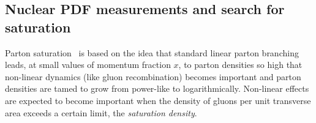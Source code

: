 \documentclass[../report.tex]{subfiles}
\begin{document}
  
\subsection{Nuclear PDF measurements and search for saturation}
\label{sec:HE_smallx}

\newcommand{\pizero}{\ensuremath{\pi^{0}}}
\newcommand{\ptjet}{\ensuremath{p_\mathrm{T,jet}}}



Parton saturation~\cite{Gribov:1984tu,Mueller:1985wy} is based on the idea that standard linear parton branching  leads, at small values of momentum fraction $x$, to parton densities so high that non-linear dynamics (like gluon recombination) becomes important and parton densities are tamed to grow from power-like to logarithmically. Non-linear effects are expected to become important when the density of gluons per unit transverse area exceeds a certain limit, the \textit{saturation density}. 
\end{document}
